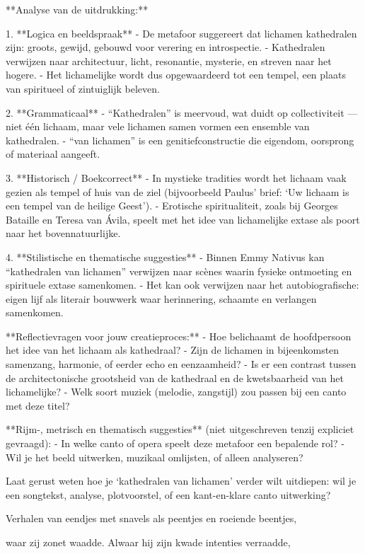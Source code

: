 **Analyse van de uitdrukking:**

1. **Logica en beeldspraak**
- De metafoor suggereert dat lichamen kathedralen zijn: groots, gewijd, gebouwd voor verering en introspectie.
- Kathedralen verwijzen naar architectuur, licht, resonantie, mysterie, en streven naar het hogere.
- Het lichamelijke wordt dus opgewaardeerd tot een tempel, een plaats van spiritueel of zintuiglijk beleven.

2. **Grammaticaal**
- “Kathedralen” is meervoud, wat duidt op collectiviteit — niet één lichaam, maar vele lichamen samen vormen een ensemble van kathedralen.
- “van lichamen” is een genitiefconstructie die eigendom, oorsprong of materiaal aangeeft.

3. **Historisch / Boekcorrect**
- In mystieke tradities wordt het lichaam vaak gezien als tempel of huis van de ziel (bijvoorbeeld Paulus’ brief: ‘Uw lichaam is een tempel van de heilige Geest’).
- Erotische spiritualiteit, zoals bij Georges Bataille en Teresa van Ávila, speelt met het idee van lichamelijke extase als poort naar het bovennatuurlijke.

4. **Stilistische en thematische suggesties**
- Binnen Emmy Nativus kan “kathedralen van lichamen” verwijzen naar scènes waarin fysieke ontmoeting en spirituele extase samenkomen.
- Het kan ook verwijzen naar het autobiografische: eigen lijf als literair bouwwerk waar herinnering, schaamte en verlangen samenkomen.

**Reflectievragen voor jouw creatieproces:**
- Hoe belichaamt de hoofdpersoon het idee van het lichaam als kathedraal?
- Zijn de lichamen in bijeenkomsten samenzang, harmonie, of eerder echo en eenzaamheid?
- Is er een contrast tussen de architectonische grootsheid van de kathedraal en de kwetsbaarheid van het lichamelijke?
- Welk soort muziek (melodie, zangstijl) zou passen bij een canto met deze titel?

**Rijm-, metrisch en thematisch suggesties** (niet uitgeschreven tenzij expliciet gevraagd):
- In welke canto of opera speelt deze metafoor een bepalende rol?
- Wil je het beeld uitwerken, muzikaal omlijsten, of alleen analyseren?

Laat gerust weten hoe je ‘kathedralen van lichamen’ verder wilt uitdiepen: wil je een songtekst, analyse, plotvoorstel, of een kant-en-klare canto uitwerking?

Verhalen van eendjes
met snavels als peentjes
en roeiende beentjes,

waar zij zonet waadde.
Alwaar hij zijn kwade
intenties verraadde,

